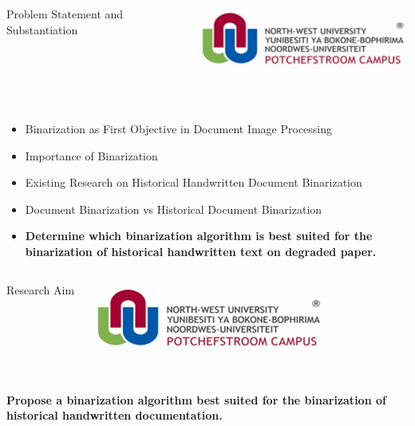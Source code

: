 \documentclass[11pt]{beamer}
\begin{document}
	\begin{frame}[t]
		\begin{columns}[onlytextwidth]
				\begin{Large}
					\vspace{-0.2cm}
					\hspace{-0.5cm}\color{beamer@maroon}Problem Statement and Substantiation
				\end{Large}
			\column{0.25\textwidth}
				\includegraphics[scale=0.4]{nwulogo.jpeg}
		\end{columns}
		\hspace{0.1cm}
		\newline
		\noindent\makebox[\linewidth]{\rule{\paperwidth}{0.4pt}}\\
		[0.8cm]
		\begin{itemize}
			\item Binarization as First Objective in Document Image Processing%
			\item Importance of Binarization %
			\item Existing Research on Historical Handwritten Document Binarization
			\item Document Binarization vs Historical Document Binarization
			\item<2-> \textbf{Determine which binarization algorithm is best suited for the binarization of historical handwritten text on degraded paper.}
		\end{itemize}
	\end{frame}


	\begin{frame}[t]
		\begin{columns}[onlytextwidth]
			\column{0.75\textwidth}
				\begin{Large}
					\vspace{-0.2cm}
					\color{beamer@maroon}Research Aim
				\end{Large}
				\includegraphics[scale=0.4]{nwulogo.jpeg}
		\end{columns}
		\hspace{0.1cm}
		\newline
		\noindent\makebox[\linewidth]{\rule{\paperwidth}{0.4pt}}\\
		[2cm]
		\textbf{Propose a binarization algorithm best suited for the binarization of historical handwritten documentation.}
	\end{frame}
\end{document}
